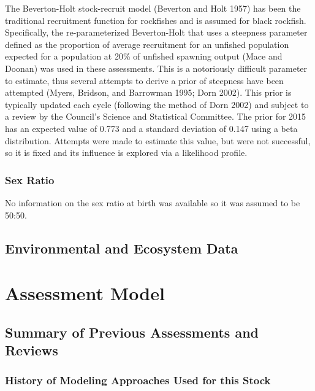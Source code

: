 \documentclass[11pt,
  english,
  letterpaper,
]{article}
\begin{document}
The Beverton-Holt stock-recruit model (Beverton and Holt 1957) has been the traditional recruitment function for rockfishes and is assumed for black rockfish. Specifically, the re-parameterized Beverton-Holt that uses a steepness parameter defined as the proportion of average recruitment for an unfished population expected for a population at 20\% of unfished spawning output (Mace and Doonan) was used in these assessments. This is a notoriously difficult parameter to estimate, thus several attempts to derive a prior of steepness have been attempted (Myers, Bridson, and Barrowman 1995; Dorn 2002). This prior is typically updated each cycle (following the method of Dorn 2002) and subject to a review by the Council's Science and Statistical Committee. The prior for 2015 has an expected value of 0.773 and a standard deviation of 0.147 using a beta distribution. Attempts were made to estimate this value, but were not successful, so it is fixed and its influence is explored via a likelihood profile.

\hypertarget{sex-ratio}{%
\subsubsection{Sex Ratio}\label{sex-ratio}}

No information on the sex ratio at birth was available so it was assumed to be 50:50.

\hypertarget{environmental-and-ecosystem-data}{%
\subsection{Environmental and Ecosystem Data}\label{environmental-and-ecosystem-data}}

\hypertarget{assessment-model}{%
\section{Assessment Model}\label{assessment-model}}

\hypertarget{summary-of-previous-assessments-and-reviews}{%
\subsection{Summary of Previous Assessments and Reviews}\label{summary-of-previous-assessments-and-reviews}}

\hypertarget{history-of-modeling-approaches-used-for-this-stock}{%
\subsubsection{History of Modeling Approaches Used for this Stock}\label{history-of-modeling-approaches-used-for-this-stock}}
\end{document}
